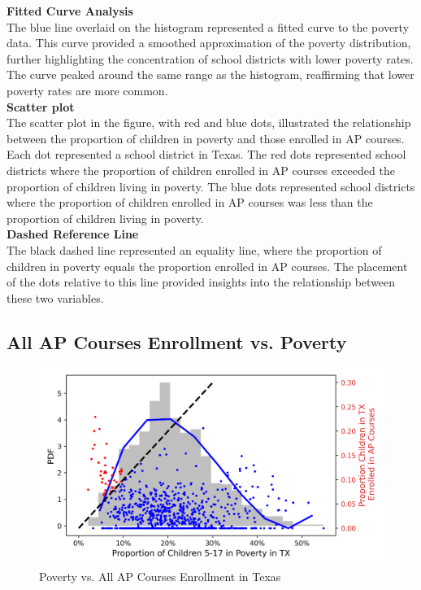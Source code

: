 \documentclass[sn-mathphys-num]{sn-jnl}%
\theoremstyle{thmstyleone}%
\theoremstyle{thmstyletwo}%
\theoremstyle{thmstylethree}%
\begin{document}
{\textbf{Fitted Curve Analysis}\\

The blue line overlaid on the histogram represented a fitted curve to the poverty data. This curve provided a smoothed approximation of the poverty distribution, further highlighting the concentration of school districts with lower poverty rates. The curve peaked around the same range as the histogram, reaffirming that lower poverty rates are more common.\\

\textbf{Scatter plot}\\

The scatter plot in the figure, with red and blue dots, illustrated the relationship between the proportion of children in poverty and those enrolled in AP courses. Each dot represented a school district in Texas. The red dots represented school districts where the proportion of children enrolled in AP courses exceeded the proportion of children living in poverty. The blue dots represented school districts where the proportion of children enrolled in AP courses was less than the proportion of children living in poverty.\\

\textbf{Dashed Reference Line}\\

The black dashed line represented an equality line, where the proportion of children in poverty equals the proportion enrolled in AP courses. The placement of the dots relative to this line provided insights into the relationship between these two variables.\\
\pagebreak

\subsection{All AP Courses Enrollment vs. Poverty}

\begin{figure}[h]
    \centering
    \includegraphics[]{Poverty_vs_APEnrollment_TX.png}
    \caption{Poverty vs. All AP Courses Enrollment in Texas}
    \label{fig:AP}
\end{figure}

}
\end{document}
